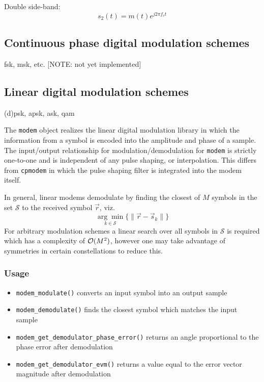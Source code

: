 Double side-band:
\[
    s_2(t) = m(t)e^{j 2 \pi f_c t}
\]

\subsection{Continuous phase digital modulation schemes}
fsk, msk, etc. [NOTE: not yet implemented]

\subsection{Linear digital modulation schemes}
(d)psk, apsk, ask, qam

The {\tt modem} object realizes the linear digital modulation library in which
the information from a symbol is encoded into the amplitude and phase of a
sample.
The input/output relationship for modulation/demodulation for {\tt modem} is
strictly one-to-one and is independent of any pulse shaping, or interpolation.
This differs from {\tt cpmodem} in which the pulse shaping filter is
integrated into the modem itself.

In general, linear modems demodulate by finding the closest of $M$ symbols in
the set $\mathcal{S}$ to the received symbol $\vec{r}$, viz.
\[
    \underset{k \in \mathcal{S}}{\arg\min}
    \bigl\{
        \| \vec{r} - \vec{s}_k \|
    \bigr\}
\]
For arbitrary modulation schemes a linear search over all symbols in
$\mathcal{S}$ is required which has a complexity of $\mathcal{O}(M^2)$, however one may
take advantage of symmetries in certain constellations to reduce this.

\subsubsection{Usage}
\begin{itemize}
\item[] {\tt modem\_modulate()} converts an input symbol into an output sample
\item[] {\tt modem\_demodulate()} finds the closest symbol which matches the
input sample
\item[] {\tt modem\_get\_demodulator\_phase\_error()} returns an angle
proportional to the phase error after demodulation
\item[] {\tt modem\_get\_demodulator\_evm()} returns a value equal to the
error vector magnitude after demodulation
\end{itemize}

